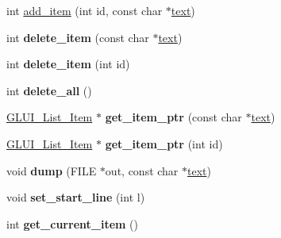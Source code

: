 \begin{DoxyCompactItemize}
\item 
int \hyperlink{classGLUI__List_ac26dc37467a0c3ddb0952f1321c4f703}{add\-\_\-item} (int id, const char $\ast$\hyperlink{classGLUI__Control_af0d60e9736f4dbc34e9a536e75876d72}{text})
\item 
\hypertarget{classGLUI__List_a2bc8c33e63c775624adf9dfa5b0ffb32}{int {\bfseries delete\-\_\-item} (const char $\ast$\hyperlink{classGLUI__Control_af0d60e9736f4dbc34e9a536e75876d72}{text})}\label{classGLUI__List_a2bc8c33e63c775624adf9dfa5b0ffb32}

\item 
\hypertarget{classGLUI__List_a1de769c475c514a2bfccf92552be8dba}{int {\bfseries delete\-\_\-item} (int id)}\label{classGLUI__List_a1de769c475c514a2bfccf92552be8dba}

\item 
\hypertarget{classGLUI__List_a68eaa8654adcd307c89e8235a049f4bf}{int {\bfseries delete\-\_\-all} ()}\label{classGLUI__List_a68eaa8654adcd307c89e8235a049f4bf}

\item 
\hypertarget{classGLUI__List_a42f0d2ea61b5fe621a4e7e95d4533534}{\hyperlink{classGLUI__List__Item}{G\-L\-U\-I\-\_\-\-List\-\_\-\-Item} $\ast$ {\bfseries get\-\_\-item\-\_\-ptr} (const char $\ast$\hyperlink{classGLUI__Control_af0d60e9736f4dbc34e9a536e75876d72}{text})}\label{classGLUI__List_a42f0d2ea61b5fe621a4e7e95d4533534}

\item 
\hypertarget{classGLUI__List_a068577ea0918ed4acb5414e2f8fc42a9}{\hyperlink{classGLUI__List__Item}{G\-L\-U\-I\-\_\-\-List\-\_\-\-Item} $\ast$ {\bfseries get\-\_\-item\-\_\-ptr} (int id)}\label{classGLUI__List_a068577ea0918ed4acb5414e2f8fc42a9}

\item 
\hypertarget{classGLUI__List_a89ccf441e37470107e513305f2d33f04}{void {\bfseries dump} (F\-I\-L\-E $\ast$out, const char $\ast$\hyperlink{classGLUI__Control_af0d60e9736f4dbc34e9a536e75876d72}{text})}\label{classGLUI__List_a89ccf441e37470107e513305f2d33f04}

\item 
\hypertarget{classGLUI__List_ad0b1a917f4e192aaabc53bb8240c5cc5}{void {\bfseries set\-\_\-start\-\_\-line} (int l)}\label{classGLUI__List_ad0b1a917f4e192aaabc53bb8240c5cc5}

\item 
\hypertarget{classGLUI__List_a68ed3cc0219ba9ed96107c10d36e5ea4}{int {\bfseries get\-\_\-current\-\_\-item} ()}\label{classGLUI__List_a68ed3cc0219ba9ed96107c10d36e5ea4}


\end{DoxyCompactItemize}
